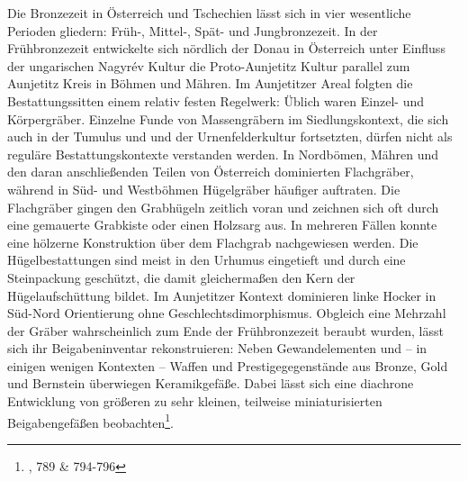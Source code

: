 \documentclass[openany,twoside,twocolumn]{book}
\let\rmarkdownfootnote\footnote%
\def\footnote{\protect\rmarkdownfootnote}
\begin{document}
Die Bronzezeit in Österreich und Tschechien lässt sich in vier
wesentliche Perioden gliedern: Früh-, Mittel-, Spät- und Jungbronzezeit.
In der Frühbronzezeit entwickelte sich nördlich der Donau in Österreich
unter Einfluss der ungarischen Nagyrév Kultur die Proto-Aunjetitz Kultur
parallel zum Aunjetitz Kreis in Böhmen und Mähren. Im Aunjetitzer Areal
folgten die Bestattungssitten einem relativ festen Regelwerk: Üblich
waren Einzel- und Körpergräber. Einzelne Funde von Massengräbern im
Siedlungskontext, die sich auch in der Tumulus und und der
Urnenfelderkultur fortsetzten, dürfen nicht als reguläre
Bestattungskontexte verstanden werden. In Nordbömen, Mähren und den
daran anschließenden Teilen von Österreich dominierten Flachgräber,
während in Süd- und Westböhmen Hügelgräber häufiger auftraten. Die
Flachgräber gingen den Grabhügeln zeitlich voran und zeichnen sich oft
durch eine gemauerte Grabkiste oder einen Holzsarg aus. In mehreren
Fällen konnte eine hölzerne Konstruktion über dem Flachgrab nachgewiesen
werden. Die Hügelbestattungen sind meist in den Urhumus eingetieft und
durch eine Steinpackung geschützt, die damit gleichermaßen den Kern der
Hügelaufschüttung bildet. Im Aunjetitzer Kontext dominieren linke Hocker
in Süd-Nord Orientierung ohne Geschlechtsdimorphismus. Obgleich eine
Mehrzahl der Gräber wahrscheinlich zum Ende der Frühbronzezeit beraubt
wurden, lässt sich ihr Beigabeninventar rekonstruieren: Neben
Gewandelementen und -- in einigen wenigen Kontexten -- Waffen und
Prestigegegenstände aus Bronze, Gold und Bernstein überwiegen
Keramikgefäße. Dabei lässt sich eine diachrone Entwicklung von größeren
zu sehr kleinen, teilweise miniaturisierten Beigabengefäßen
beobachten\footnote{\textcite{lubos_czech_2013}, 789 \& 794-796}.
\end{document}
